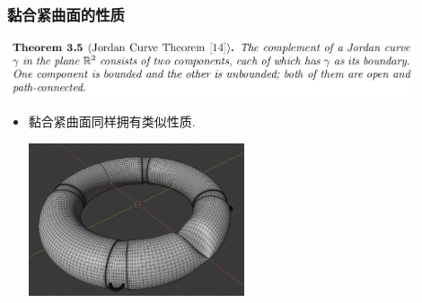 \documentclass[UTF8]{ctexbeamer}	%
\theoremstyle{plain}
\theoremstyle{definition}
\theoremstyle{remark}
\numberwithin{equation}{section}
\begin{document}
\begin{frame}
    \frametitle{黏合紧曲面的性质}
    \begin{center}
        \includegraphics[width = 0.9\textwidth]{fig/jordancurve.png}
    \end{center}
        \begin{itemize}
            \item 黏合紧曲面同样拥有类似性质.
            \vspace{0.2in}
            \begin{center}
                \includegraphics[width = 0.5\textwidth]{fig/past.png}
            \end{center}
        \end{itemize}
\end{frame}
\end{document}
